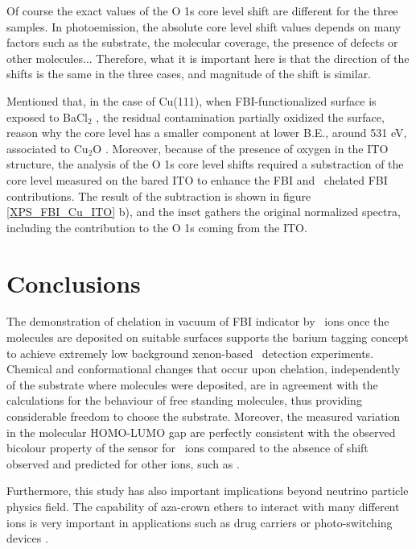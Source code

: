 \documentclass[aps,prl,reprint,longbibliography,superscriptaddress, english]{revtex4-1}
\def\BappCl{BaCl$_2$ }
\begin{document}
Of course the exact values of the O 1s core level shift are different for the three samples. In photoemission, the absolute core level shift values depends on many factors such as the substrate, the molecular coverage, the presence of defects or other molecules... Therefore, what it is important here is that the direction of the shifts is the same in the three cases, and magnitude of the shift is similar. 

Mentioned that, in the case of Cu(111), when FBI-functionalized surface is exposed to \BappCl, the residual contamination partially oxidized the surface, reason why the core level has a smaller component at lower B.E., around 531 eV, associated to  Cu$_2$O \cite{zhu_surface_2013}. Moreover, because of the presence of oxygen in the ITO structure, the analysis of the O 1s core level shifts required a substraction of the core level measured on the bared ITO to enhance the FBI and \Bapp\ chelated FBI contributions. The result of the subtraction is shown in figure \ref{XPS_FBI_Cu_ITO} b), and the inset gathers the original normalized spectra, including the contribution to the  O 1s coming from the ITO.  



\section{Conclusions}
The demonstration of chelation in vacuum of FBI indicator by \Bapp\ ions once the molecules are deposited on suitable surfaces supports the barium tagging concept to achieve extremely low background xenon-based \bbonu\ detection experiments. Chemical and conformational changes that occur upon chelation, independently of the substrate where molecules were deposited, are in agreement with the calculations for the behaviour of free standing molecules, thus providing considerable freedom to choose the substrate. Moreover, the measured variation in the molecular HOMO-LUMO gap are perfectly consistent with the observed bicolour property of the sensor for \Bapp\ ions compared to the absence of shift observed and predicted for other ions, such as \Nap.  

Furthermore, this study has also important implications beyond neutrino particle physics field. The capability of {aza-crown ethers} to interact with many different ions is very important in applications such as drug carriers \cite{uchegbu_non-ionic_1998} or photo-switching devices \cite{malval_photoswitching_2002,uda_membrane_2005}. 
\end{document}
